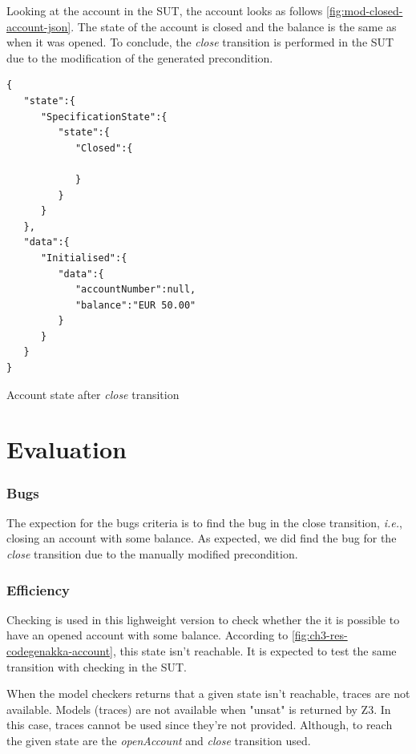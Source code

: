 Looking at the account in the SUT, the account looks as follows
\autoref{fig:mod-closed-account-json}. The state of the account is closed and
the balance is the same as when it was opened. To conclude, the \textit{close}
transition is performed in the SUT due to the modification of the generated
precondition.

\begin{sourcecode}[h!]
\begin{lstlisting}[]
{
   "state":{
      "SpecificationState":{
         "state":{
            "Closed":{

            }
         }
      }
   },
   "data":{
      "Initialised":{
         "data":{
            "accountNumber":null,
            "balance":"EUR 50.00"
         }
      }
   }
}
\end{lstlisting}
\caption{Account state after \textit{close} transition}\label{fig:mod-closed-account-json}
\end{sourcecode}
\FloatBarrier

\section{Evaluation}\label{sec:ch3-evalution}

\subsubsection{Bugs}
The expection for the bugs criteria is to find the bug in the close transition,
\textit{i.e.}, closing an account with some balance. As expected, we did find
the bug for the \textit{close} transition due to the
manually modified precondition.

\subsubsection{Efficiency}

Checking is used in this lighweight version to check whether the it is possible
to have an opened account with some balance. According to
\autoref{fig:ch3-res-codegenakka-account}, this state isn't reachable. It is
expected to test the same transition with checking in the SUT.

When the model checkers returns that a given state isn't reachable,
traces are not available. Models (traces) are not available when "unsat" is
returned by Z3.
In this case, traces cannot be used since they're not provided. Although, to
reach the given state are the \textit{openAccount} and \textit{close} transition
used.

